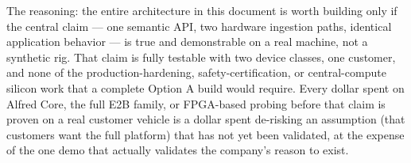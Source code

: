 The reasoning: the entire architecture in this document is worth building only if the central claim --- one semantic API, two hardware ingestion paths, identical application behavior --- is true and demonstrable on a real machine, not a synthetic rig. That claim is fully testable with two device classes, one customer, and none of the production-hardening, safety-certification, or central-compute silicon work that a complete Option A build would require. Every dollar spent on Alfred Core, the full E2B family, or FPGA-based probing before that claim is proven on a real customer vehicle is a dollar spent de-risking an assumption (that customers want the full platform) that has not yet been validated, at the expense of the one demo that actually validates the company's reason to exist.
